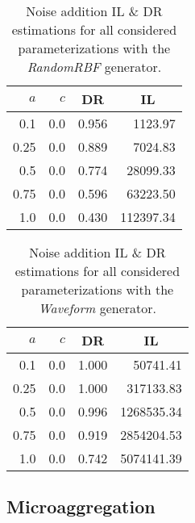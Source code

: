 \begin{minipage}[t]{0.5\textwidth}
	\begin{flushleft}
	\begin{table}[H]
		\centering
		\begin{tabular}{@{}rrrr@{}}
			\toprule
			$a$ & $c$ & \multicolumn{1}{c}{DR} & \multicolumn{1}{c}{IL} \\ \midrule
			0.1 & 0.0 & 0.956	& 1123.97 \\
			0.25 & 0.0 & 0.889 & 7024.83 \\
			0.5 & 0.0 & 0.774	& 28099.33 \\
			0.75 & 0.0 & 0.596 & 63223.50 \\
			1.0 & 0.0 & 0.430 & 112397.34 \\ \bottomrule
		\end{tabular}
		\caption[Noise addition DR \& IL estimations (RandomRBF).]{Noise addition IL \& DR estimations for all considered parameterizations with the \textit{RandomRBF} generator.}
		\label{table:results-rbf-noise-addition}
	\end{table}
	\end{flushleft}
\end{minipage}
\begin{minipage}[t]{0.5\textwidth}
	\begin{flushright}
	\begin{table}[H]
		\centering
		\begin{tabular}{@{}rrrr@{}}
			\toprule
			$a$ & $c$ & \multicolumn{1}{c}{DR} & \multicolumn{1}{c}{IL} \\ \midrule
			0.1  & 0.0 & 1.000 & 50741.41   \\
			0.25 & 0.0 & 1.000 & 317133.83  \\
			0.5  & 0.0 & 0.996 & 1268535.34 \\
			0.75 & 0.0 & 0.919 & 2854204.53 \\
			1.0  & 0.0 & 0.742 & 5074141.39 \\ \bottomrule
		\end{tabular}
		\caption[Noise addition DR \& IL estimations (Waveform).]{Noise addition IL \& DR estimations for all considered parameterizations with the \textit{Waveform} generator.}
		\label{table:results-wave-noise-addition}
	\end{table}
	\end{flushright}
\end{minipage}

\subsection{Microaggregation}
\label{Benchmarking:Results:MicroAgg}

